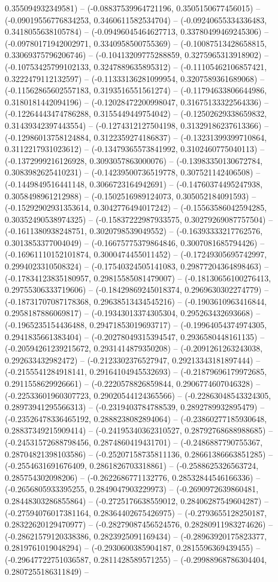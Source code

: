 0.355094932349581) -- (-0.08837539964721196, 0.3505150677456015) -- (-0.09019556776834253, 0.3460611582534704) -- (-0.09240655334336483, 0.3418055638105784) -- (-0.09496045464627713, 0.33780499469245306) -- (-0.09780171942002971, 0.3340958500755369) -- (-0.10087513428658815, 0.33069375796206746) -- (-0.10413209775288859, 0.3275965313918902) -- (-0.10753425799102133, 0.3247889635895312) -- (-0.11105462106857421, 0.3222479112132597) -- (-0.11333136281099954, 0.3207589361689068) -- (-0.11562865602557183, 0.3193516551561274) -- (-0.11794633806644986, 0.3180181442094196) -- (-0.12028472200998047, 0.31675133322564336) -- (-0.12264443474786288, 0.3155449449754042) -- (-0.12502629338659832, 0.31439342397443554) -- (-0.1274312127504198, 0.31329186237613366) -- (-0.12986013758124884, 0.3122359274186837) -- (-0.13231399399710864, 0.3112217931023612) -- (-0.13479365573841992, 0.3102460775040113) -- (-0.1372999216126928, 0.3093057863000076) -- (-0.13983350130672784, 0.3083982625410231) -- (-0.14239500736519778, 0.307521142406508) -- (-0.1449849516441148, 0.3066723164942691) -- (-0.14760374495247938, 0.3058498961212988) -- (-0.1502516989124073, 0.305052184091593) -- (-0.15292902931353614, 0.3042776494017242) -- (-0.15563586042594285, 0.30352490538974325) -- (-0.15837222987933575, 0.30279269087757504) -- (-0.1611380938248751, 0.3020798539049552) -- (-0.16393333217762576, 0.3013853377004049) -- (-0.16675775379864846, 0.3007081685794426) -- (-0.16961110152101874, 0.3000474455011452) -- (-0.17249305695742997, 0.2994023310508324) -- (-0.17540324505141083, 0.29877204364898463) -- (-0.17834123835180957, 0.29815585081479007) -- (-0.18130656100276413, 0.29755306333719606) -- (-0.18429869245018374, 0.2969630302274779) -- (-0.18731707087178368, 0.29638513434545216) -- (-0.1903610963416844, 0.2958187886069817) -- (-0.19343013374305304, 0.295263432693668) -- (-0.1965235154436488, 0.29471853019693717) -- (-0.19964054374974305, 0.2941835661383404) -- (-0.20278049315394547, 0.2936580448161135) -- (-0.20594261239215672, 0.2931414879350208) -- (-0.2091261263243038, 0.292633432982472) -- (-0.2123302376527947, 0.29213343181897444) -- (-0.2155541284918141, 0.29164104945532693) -- (-0.21879696179972685, 0.2911558629926661) -- (-0.2220578826859844, 0.2906774607046328) -- (-0.22533601960307723, 0.29020544124365566) -- (-0.22863048543324305, 0.28973941295566313) -- (-0.2319403784788539, 0.2892789932895479) -- (-0.23526478336465192, 0.2888238082894064) -- (-0.23860277185930648, 0.28837349215909414) -- (-0.24195340362310527, 0.28792768688988685) -- (-0.24531572688798456, 0.2874860419431701) -- (-0.2486887790755367, 0.28704821398103586) -- (-0.25207158735811136, 0.28661386663851285) -- (-0.2554631691676409, 0.2861826703318861) -- (-0.2588625326563724, 0.285754302098206) -- (-0.2622686771132776, 0.28532844546166336) -- (-0.2656805933395255, 0.2849047903229973) -- (-0.2690972639860481, 0.28448303286855864) -- (-0.2725176638559012, 0.28406287549604287) -- (-0.27594076017381164, 0.28364402675426975) -- (-0.2793655128250187, 0.28322620129470977) -- (-0.28279087456524576, 0.28280911983274626) -- (-0.28621579120338386, 0.2823925091169434) -- (-0.28963920175823377, 0.2819761019048294) -- (-0.2930600385904187, 0.2815596369439455) -- (-0.29647722751036587, 0.2811428589571255) -- (-0.29988968786304404, 0.2807255186311849) -- 